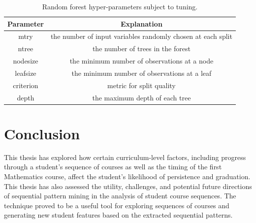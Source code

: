 \begin{table}[htbp]
\begin{center}
\begin{tabular}{ |c|c| } 
 \hline
 Parameter & Explanation  \\ 
 \hline
 mtry & the number of input variables randomly chosen at each split \\ 
 \hline
 ntree & the number of trees in the forest  \\
 \hline
 nodesize & the minimum number of observations at a node  \\
 \hline
 leafsize & the minimum number of observations at a leaf  \\
 \hline
 criterion & metric for split quality  \\
 \hline
 depth & the maximum depth of each tree  \\
 \hline
\end{tabular}
\end{center}
\caption{Random forest hyper-parameters subject to tuning.}
\label{scikit_parameters_table}
\end{table}


\chapter{Conclusion}

This thesis has explored how certain curriculum-level factors, including progress through a student's sequence of courses as well as the timing of the first Mathematics course, affect the student's likelihood of persistence and graduation.  This thesis has also assessed the utility, challenges, and potential future directions of sequential pattern mining in the analysis of student course sequences.  The technique proved to be a useful tool for exploring sequences of courses and generating new student features based on the extracted sequential patterns.

